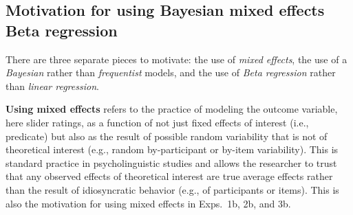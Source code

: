 \documentclass[11pt,fleqn]{article}
\newcommand{\6}{\mbox{$[\hspace*{-.6mm}[$}}
\newcommand{\9}{\mbox{$]\hspace*{-.6mm}]$}}
\begin{document}
{\subsection{Motivation for using Bayesian mixed effects Beta regression}

There are three separate pieces to motivate: the use of \emph{mixed effects}, the use of a \emph{Bayesian} rather than \emph{frequentist} models, and the use of \emph{Beta regression} rather than \emph{linear regression}. 

\textbf{Using mixed effects} refers to the practice of modeling the outcome variable, here slider ratings, as a function of not just fixed effects of interest (i.e., predicate) but also as the result of possible random variability that is not of theoretical interest (e.g., random by-participant or by-item variability). This is standard practice in psycholinguistic studies and allows the researcher to trust that any observed effects of theoretical interest are true average effects rather than the result of idiosyncratic behavior (e.g., of participants or items). This is also the motivation for using mixed effects in Exps.~1b, 2b, and 3b.

}
\end{document}

